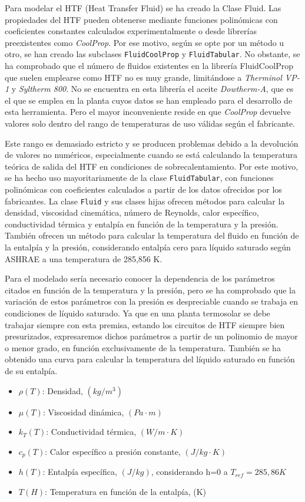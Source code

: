 Para modelar el HTF (Heat Transfer Fluid) se ha creado la Clase Fluid. Las propiedades del HTF pueden obtenerse mediante funciones polinómicas con coeficientes constantes calculados experimentalmente o desde librerías preexistentes como \textit{CoolProp}. Por ese motivo, según se opte por un método u otro, se han creado las subclases \texttt{FluidCoolProp} y \texttt{FluidTabular}. No obstante, se ha comprobado que el número de fluidos existentes en la librería FluidCoolProp que suelen emplearse como HTF no es muy grande, limitándose a \emph{Therminol VP-1} y \emph{Syltherm 800}. No se encuentra en esta librería el aceite \emph{Dowtherm-A}, que es el que se emplea en la planta cuyos datos se han empleado para el desarrollo de esta herramienta. Pero el mayor inconveniente reside en que \emph{CoolProp} devuelve valores solo dentro del rango de temperaturas de uso válidas según el fabricante. 

Este rango es demasiado estricto y se producen problemas debido a la devolución de valores no numéricos, especialmente cuando se está calculando la temperatura teórica de salida del HTF en condiciones de sobrecalentamiento. Por este motivo, se ha hecho uso mayoritariamente de la clase \texttt{FluidTabular}, con funciones polinómicas con coeficientes calculados a partir de los datos ofrecidos por los fabricantes.  La clase \texttt{Fluid} y sus clases hijas ofrecen métodos para calcular la densidad, viscosidad cinemática, número de Reynolds, calor específico, conductividad térmica y entalpía en función de la temperatura y la presión. También ofrecen un método para calcular la temperatura del fluido en función de la entalpía y la presión, considerando entalpía cero para líquido saturado según ASHRAE a una temperatura de 285,856 K.

Para el modelado sería necesario conocer la dependencia de los parámetros citados en función de la temperatura y la presión, pero se ha comprobado que la variación de estos parámetros con la presión es despreciable cuando se trabaja en condiciones de líquido saturado. Ya que en una planta termosolar se debe trabajar siempre con esta premisa, estando los circuitos de HTF siempre bien presurizados, expresaremos dichos parámetros  a partir de un polinomio de mayor o menor grado, en función exclusivamente de la temperatura. También se ha obtenido una curva para calcular la temperatura del líquido saturado en función de su entalpía.

\begin{itemize}
\item
  $\rho(T)$: Densidad, $(kg/m^3)$
\item
  $\mu(T)$: Viscosidad dinámica, $(Pa \cdot m)$
\item
  $k_T(T)$: Conductividad térmica, $(W/m \cdot K)$
\item
  $c_p(T)$: Calor específico a presión constante, $(J/kg\cdot K)$
\item
$h(T)$: Entalpía específica, $(J/kg)$, considerando h=0 a $T_{ref}= 285,86 K$
\item
$T(H)$: Temperatura en función de la entalpía, (K)
\end{itemize}

